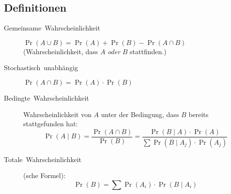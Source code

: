 \subsection{Definitionen}
\begin{description}
  \item [{Gemeinsame~Wahrscheinlichkeit}] 
	$\Pr(A\cup B)=\Pr(A)+\Pr(B)-\Pr(A\cap B)$ (Wahrscheinlichkeit, dass $A$ \emph{oder} $B$ stattfinden.)
  \item [{Stochastisch~unabhängig}] 
	$\Pr(A\cap B)=\Pr(A)\cdot \Pr(B)$
  \item [{Bedingte~Wahrscheinlichkeit}] 
	Wahrscheinlichkeit von $A$ unter der Bedingung, dass $B$ bereits stattgefunden hat:
	\[
	  \Pr(A \mid B) = \frac{\Pr(A \cap B)}{\Pr(B)}
                    = \frac{\Pr(B \mid A) \cdot \Pr(A)}{ \sum \Pr(B \mid A_j) \cdot \Pr(A_j) }
	\]

  \item [{Totale~Wahrscheinlichkeit}] 
	(sche Formel):
	\[
	  \Pr(B) = \sum \Pr(A_i) \cdot \Pr(B \mid A_i)
	\]


\end{description}
